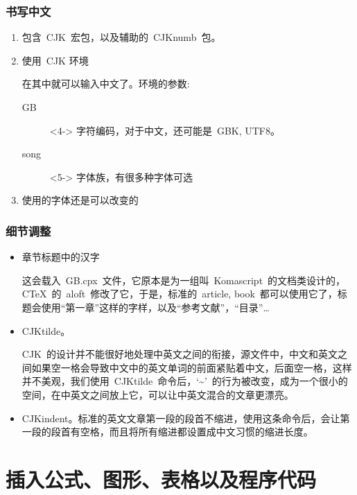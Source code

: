 \begin{frame}
	\frametitle{书写中文}
	\begin{enumerate}
		\item<2-> 包含~CJK~宏包，以及辅助的~CJKnumb~包。
		\item<3-> 使用~CJK 环境
			
			在其中就可以输入中文了。环境的参数:
			\begin{description}
				\item[GB]<4-> 字符编码，对于中文，还可能是~GBK, UTF8。
				\item[song]<5-> 字体族，有很多种字体可选
			\end{description}
		\item<6-> 使用的字体还是可以改变的
			
	\end{enumerate}
\end{frame}

\begin{frame}
	\frametitle{细节调整}
	\begin{itemize}
		\item<2-> 章节标题中的汉字
			
			这会载入~GB.cpx~文件，它原本是为一组叫~Komascript~的文档类设计的，CTeX~的~\alert{aloft}~修改了它，于是，标准的~article, book~都可以使用它了，标题会使用``第一章''这样的字样，以及``参考文献''，``目录''\ldots
		\item<3-> CJKtilde。
			
			CJK~的设计并不能很好地处理中英文之间的衔接，源文件中，中文和英文之间如果空一格会导致中文中的英文单词的前面紧贴着中文，后面空一格，这样并不美观，我们使用~CJKtilde~命令后，`\~{}'~的行为被改变，成为一个很小的空间，在中英文之间放上它，可以让中英文混合的文章更漂亮。

		\item<4-> CJKindent。标准的英文文章第一段的段首不缩进，使用这条命令后，会让第一段的段首有空格，而且将所有缩进都设置成中文习惯的缩进长度。
	\end{itemize}
\end{frame}

\section{插入公式、图形、表格以及程序代码}

